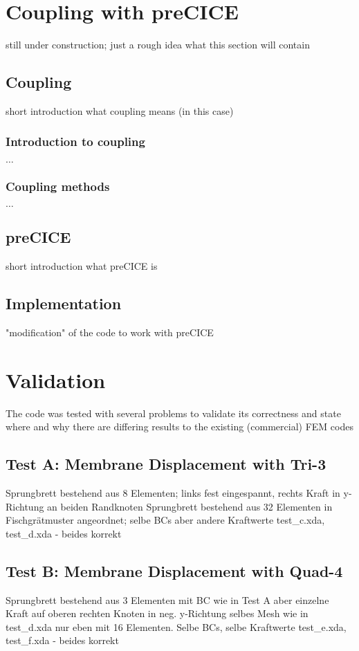 \documentclass[11pt,twoside]{scrartcl}
\begin{document}
\section{Coupling with preCICE}
still under construction; just a rough idea what this section will contain
 \subsection{Coupling}
 short introduction what coupling means (in this case)
  \subsubsection{Introduction to coupling}
  $\dots$
  \subsubsection{Coupling methods}
  $\dots$
 \subsection{preCICE}
 short introduction what preCICE is
 \subsection{Implementation}
 "modification" of the code to work with preCICE
\newpage
\section{Validation}
The code was tested with several problems to validate its correctness and state where and why there are differing results to the existing (commercial) FEM codes
 \subsection{Test A: Membrane Displacement with Tri-3}
 Sprungbrett bestehend aus 8 Elementen; links fest eingespannt, rechts Kraft in y-Richtung an beiden Randknoten\newline
 Sprungbrett bestehend aus 32 Elementen in Fischgrätmuster angeordnet; selbe BCs aber andere Kraftwerte\newline
 test\_c.xda, test\_d.xda - beides korrekt
 \subsection{Test B: Membrane Displacement with Quad-4}
 Sprungbrett bestehend aus 3 Elementen mit BC wie in Test A aber einzelne Kraft auf oberen rechten Knoten in neg. y-Richtung\newline
 selbes Mesh wie in test\_d.xda nur eben mit 16 Elementen. Selbe BCs, selbe Kraftwerte\newline
 test\_e.xda, test\_f.xda - beides korrekt
\end{document}
